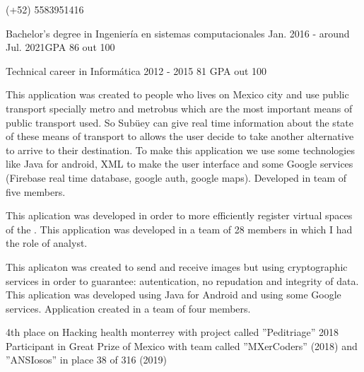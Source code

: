 \documentclass{resume}
\begin{document}
{}
{}
{(+52) 5583951416}

{Bachelor's degree in Ingeniería en sistemas computacionales}
{Jan. 2016 - around Jul. 2021}{GPA 86 out 100}\break

{Technical career in Informática}
{2012 - 2015} 
{81 GPA out 100}

{This application was created to people who lives on Mexico city and use public transport specially metro and metrobus which are the most important means of public transport used. So Subüey can give real time information about the state of these means of transport to allows the user decide to take another alternative to arrive to their destination. To make this application we use some technologies like Java for android, XML to make the user interface and some Google services (Firebase real time database, google auth, google maps). Developed in team of five members.}

{This aplication was developed in order to more efficiently register virtual spaces of the . This application was developed in a team of 28 members in which I had the role of analyst.}

{This aplicaton was created to send and receive images but using cryptographic services in order to guarantee: autentication, no repudation and integrity of data. This aplication was developed using Java for Android and using some Google services. Application created in a team of four members.}

{4th place on Hacking health monterrey with project called ''Peditriage''}
{2018}
{Participant in Great Prize of Mexico with team called ''MXerCoders'' (2018) and ''ANSIosos'' in place 38 of 316 (2019)}
{}
\end{document}
